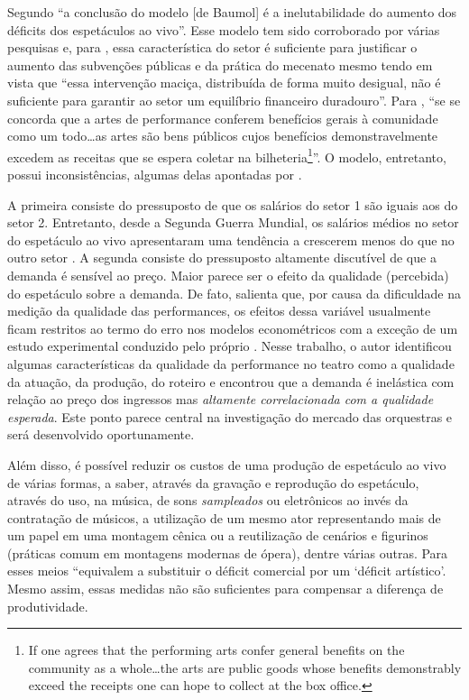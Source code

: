 \documentclass[a4paper, 12pt, openright, oneside, german, french, english, brazil]{abntex2}
\begin{document}
	Segundo  ``a conclusão do modelo [de Baumol] é a inelutabilidade do aumento dos déficits dos espetáculos ao vivo''. Esse modelo tem sido corroborado por várias pesquisas \cite[e.g.]{throsby1979economics,leroy1980economie,peacock1983inflation,baumol1984inflation,dias2011artes} e, para , essa característica do setor é suficiente para justificar o aumento das subvenções públicas e da prática do mecenato mesmo tendo em vista que ``essa intervenção maciça, distribuída de forma muito desigual, não é suficiente para garantir ao setor um equilíbrio financeiro duradouro''. Para , ``se se concorda que a artes de performance conferem benefícios gerais à comunidade como um todo\ldots as artes são bens públicos cujos benefícios demonstravelmente excedem as receitas que se espera coletar na bilheteria\footnote{If one agrees that the performing arts confer general benefits on the community as a whole\ldots the arts are public goods whose benefits demonstrably exceed the receipts one can hope to collect at the box office.}''. O modelo, entretanto, possui inconsistências, algumas delas apontadas por .

	A primeira consiste do pressuposto de que os salários do setor 1 são iguais aos do setor 2. Entretanto, desde a Segunda Guerra Mundial, os salários médios no setor do espetáculo ao vivo apresentaram uma tendência a crescerem menos do que no outro setor . A segunda consiste do pressuposto altamente discutível de que a demanda é sensível ao preço. Maior parece ser o efeito da qualidade (percebida) do espetáculo sobre a demanda. De fato,  salienta que, por causa da dificuldade na medição da qualidade das performances, os efeitos dessa variável usualmente ficam restritos ao termo do erro nos modelos econométricos com a exceção de um estudo experimental conduzido pelo próprio . Nesse trabalho, o autor identificou algumas características da qualidade da performance no teatro como a qualidade da atuação, da produção, do roteiro e encontrou que a demanda é inelástica com relação ao preço dos ingressos mas \textit{altamente correlacionada com a qualidade esperada}. Este ponto parece central na investigação do mercado das orquestras e será desenvolvido oportunamente.

	Além disso, é possível reduzir os custos de uma produção de espetáculo ao vivo de várias formas, a saber, através da gravação e reprodução do espetáculo, através do uso, na música, de sons \textit{sampleados} ou eletrônicos ao invés da contratação de músicos, a utilização de um mesmo ator representando mais de um papel em uma montagem cênica ou a reutilização de cenários e figurinos (práticas comum em montagens modernas de ópera), dentre várias outras. Para  esses meios ``equivalem a substituir o déficit comercial por um `déficit artístico'. Mesmo assim, essas medidas não são suficientes para compensar a diferença de produtividade.
\end{document}
